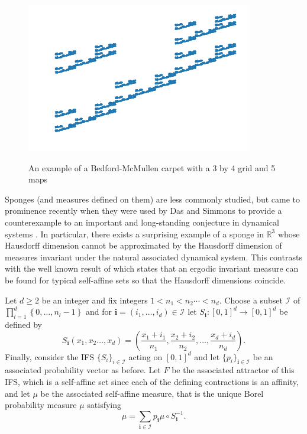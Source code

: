 \begin{figure}[h]
	\centering
	\includegraphics[width=0.8\linewidth]{pics/ch-upper-reg/self-affine-ex.png}
	\label{ch-upper-reg:fig:example-self-affine}
	\caption{An example of a Bedford-McMullen carpet with a 3 by 4 grid and 5 maps}
\end{figure}


Sponges (and measures defined on them) are less commonly studied, but came to prominence recently when they were used by Das and Simmons to provide a counterexample to an important and long-standing conjecture in dynamical systems \cite{das-simmons}. In particular, there exists a surprising example of a sponge in $\mathbb{R}^3$ whose Hausdorff dimension cannot be approximated by the Hausdorff dimension of measures invariant under the natural associated dynamical system. This contrasts with the well known result of \cite{kaenmaki-affine} which states that an ergodic invariant measure can be found for typical self-affine sets so that the Hausdorff dimensions coincide.


Let $d \geq 2$ be an integer and fix integers $1<n_1 < n_2 \cdots < n_d$.  Choose a subset $\mathcal{I}$ of $\prod_{l=1}^{d} \left\lbrace 0,\ldots, n_l-1 \right\rbrace$ and for $\textbf{i}=(i_1, \ldots, i_d)\in \mathcal{I} $  let $S_{\textbf{i}} \colon [0,1]^d \rightarrow [0,1]^d$ be defined by
\[
S_{\textbf{i}}(x_1,x_2\ldots, x_d)= \left( \frac{x_1+i_1}{n_1}, \frac{x_2+i_2}{n_2}, \ldots, \frac{x_d+i_d}{n_d} \right) .
\]
Finally, consider the IFS $\{S_i\}_{i \in \mathcal{I}}$  acting on $[0,1]^d$ and let $\{p_i\}_{\mathbf{i} \in \mathcal{I}}$ be an associated probability vector as before.  Let $F$ be the associated attractor of this IFS, which is a self-affine set since each of the defining contractions is an affinity, and let $\mu$ be the associated self-affine measure, that is the unique Borel probability measure $\mu$ satisfying
\[
\mu = \sum_{\mathbf{i} \in \mathcal{I}} p_{\mathbf{i}} \mu \circ S_{\mathbf{i}}^{-1}.
\] 



